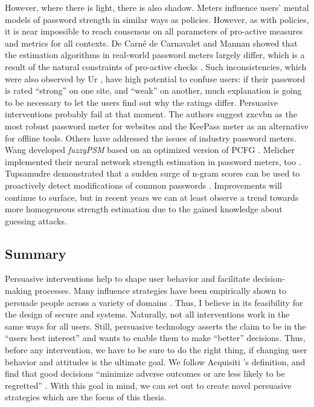 	However, where there is light, there is also shadow. Meters influence users' mental models of password strength in similar ways as policies. However, as with policies, it is near impossible to reach consensus on all parameters of pro-active measures and metrics for all contexts. 
	De Carné de Carnavalet and Mannan showed that the estimation algorithms in real-world password meters largely differ, which is a result of the natural constraints of pro-active checks \cite{DeCarnedeCarnavalet2015PasswordMeters}. Such inconsistencies, which were also observed by Ur \etal \cite{Ur2012HowDoesYourPasswordMeasureUp}, have high potential to confuse users: if their password is rated ``strong'' on one site, and ``weak'' on another, much explanation is going to be necessary to let the users find out why the ratings differ. Persuasive interventions probably fail at that moment. The authors suggest zxcvbn as the most robust password meter for websites and the KeePass meter as an alternative for offline tools. Others have addressed the issues of industry password meters. Wang \etal developed \textit{fuzzyPSM} based on an optimized version of \gls{PCFG} \cite{Wang2016fuzzyPWM}. Melicher \etal implemented their neural network strength estimation in password meters, too \cite{Melicher2016NeuralNetworks}. Tupsamudre \etal demonstrated that a sudden surge of n-gram scores can be used to proactively detect modifications of common passwords \cite{Tupsamudre2016MarkovStrength}. Improvements will continue to surface, but in recent years we can at least observe a trend towards more homogeneous strength estimation due to the gained knowledge about guessing attacks.

	\subsection{Summary}
	Persuasive interventions help to shape user behavior and facilitate decision-making processes. Many influence strategies have been empirically shown to persuade people across a variety of domains \cite{Hamari2014DoPersuasiveTechnologies}. Thus, I believe in its feasibility for the design of secure and systems. Naturally, not all interventions work in the same ways for all users. Still, persuasive technology asserts the claim to be in the ``users best interest'' and wants to enable them to make ``better'' decisions. Thus, before any intervention, we have to be sure to do the right thing, if changing user behavior and attitudes is the ultimate goal. We follow Acquisiti \etal's definition, and find that good decisions ``minimize adverse outcomes or are less likely to be regretted'' \cite{Acquisti2017NudgesPrivacySecurity}. With this goal in mind, we can set out to create novel persuasive strategies which are the focus of this thesis. 